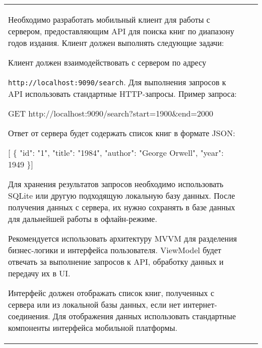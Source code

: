 \documentclass[a4paper]{article}
\begin{document}
\begin{tabular}{!{\vrule width 2pt}p{5cm}|p{6cm}|p{4cm}!{\vrule width 2pt}}
{\begin{minipage}{16cm}
\begin{enumerate}
Необходимо разработать мобильный клиент для работы с сервером, предоставляющим API для поиска книг по диапазону годов издания. Клиент должен выполнять следующие задачи:


Клиент должен взаимодействовать с сервером по адресу 

\texttt{http://localhost:9090/search}. Для выполнения запросов к API использовать стандартные HTTP-запросы. Пример запроса:

 GET http://localhost:9090/search?start=1900\&end=2000 

Ответ от сервера будет содержать список книг в формате JSON:

 [ \{ "id": "1", "title": "1984", "author": "George Orwell", 
    "year": 1949 \}] 


Для хранения результатов запросов необходимо использовать SQLite или другую подходящую локальную базу данных. После получения данных с сервера, их нужно сохранять в базе данных для дальнейшей работы в офлайн-режиме.


Рекомендуется использовать архитектуру MVVM для разделения бизнес-логики и интерфейса пользователя. ViewModel будет отвечать за выполнение запросов к API, обработку данных и передачу их в UI.


Интерфейс должен отображать список книг, полученных с сервера или из локальной базы данных, если нет интернет-соединения. Для отображения данных использовать стандартные компоненты интерфейса мобильной платформы.



\end{enumerate}
\end{minipage}}
\end{tabular}
\end{document}
